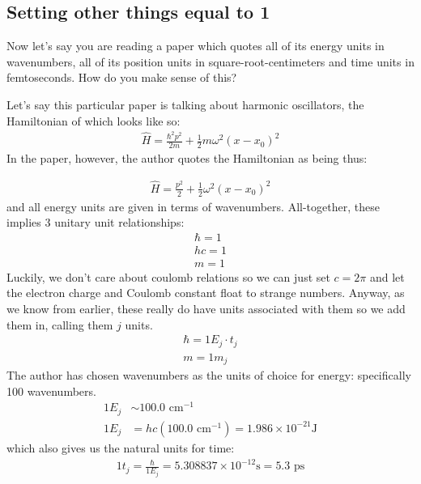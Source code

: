 \subsection{Setting other things equal to 1}
Now let's say you are reading a paper which quotes all of its energy units in wavenumbers, all of its position units in square-root-centimeters and time units in femtoseconds.  How do you make sense of this?

Let's say this particular paper is talking about harmonic oscillators, the Hamiltonian of which looks like so:
\begin{align*}
	\hat{H} = \frac{\hbar^2 p^2}{2 m	} + \frac{1}{2} m \omega^2 (x - x_0)^2
\end{align*}
In the paper, however, the author quotes the Hamiltonian as being thus:

\begin{align*}
	\hat{H} = \frac{p^2}{2} + \frac{1}{2} \omega^2 (x - x_0)^2
\end{align*}
and all energy units are given in terms of wavenumbers.  All-together, these implies 3 unitary unit relationships:
\begin{align*}
	\hbar = 1 \\
	hc = 1 \\
	m = 1
\end{align*}
Luckily, we don't care about coulomb relations so we can just set $c=2 \pi$ and let the electron charge and Coulomb constant float to strange numbers.  Anyway, as we know from earlier, these really do have units associated with them so we add them in, calling them $j$ units.
\begin{align*}
	\hbar = 1 E_j \cdot t_j \\
	m = 1 m_j
\end{align*}
The author has chosen wavenumbers as the units of choice for energy: specifically 100 wavenumbers.
\begin{align*}
	1 E_j &\sim 100.0 \text{ cm}^{-1} \\
	1 E_j &= h c (100.0 \text{ cm}^{-1}) = 1.986 \times 10^{-21} \text{J}
\end{align*}
which also gives us the natural units for time:
\begin{align*}
	1 t_j = \frac{\hbar}{1 E_j} = 5.308837 \times 10^{-12} \text{s} = 5.3 \text{ ps}
\end{align*}


